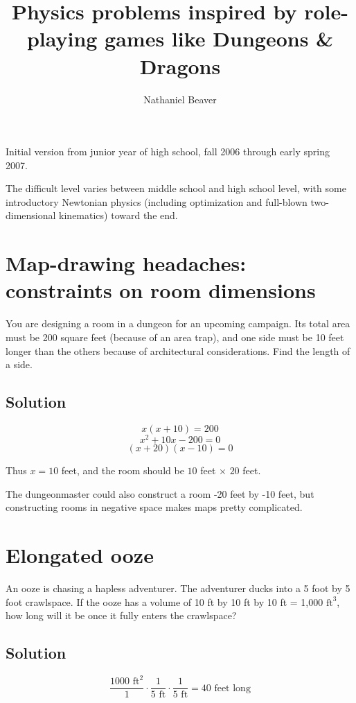 \documentclass[12pt,letterpaper]{article}
\author{Nathaniel Beaver}
\title{Physics problems inspired by role-playing games like Dungeons \& Dragons}
\begin{document}
\maketitle

Initial version from junior year of high school, fall 2006 through early spring 2007.

The difficult level varies between middle school and high school level, with some introductory Newtonian physics (including optimization and full-blown two-dimensional kinematics) toward the end.

\section{Map-drawing headaches: constraints on room dimensions}

You are designing a room in a dungeon for an upcoming campaign. Its total area must be 200 square feet (because of an area trap), and one side must be 10 feet longer than the others because of architectural considerations. Find the length of a side.

\subsection{Solution}

\[x(x+10) = 200\]
\[x^2 + 10x - 200 = 0\]
\[(x+20)(x-10) = 0\]

Thus $x = 10$ feet, and the room should be $10$ feet $\times$ $20$ feet.

The dungeonmaster could also construct a room -20 feet by -10 feet, but constructing rooms in negative space makes maps pretty complicated.

\section{Elongated ooze}

An ooze is chasing a hapless adventurer. The adventurer ducks into a 5 foot by 5 foot crawlspace. If the ooze has a volume of 10 ft by 10 ft by 10 ft = 1,000 $\textrm{ft}^3$, how long will it be once it fully enters the crawlspace?

\subsection{Solution}

\[
\frac{1000 \textrm{ ft}^2}{1}
\cdot
\frac{1}{5 \textrm{ ft}}
\cdot
\frac{1}{5 \textrm{ ft}}
=
40 \textrm{ feet long}
\]
\end{document}
